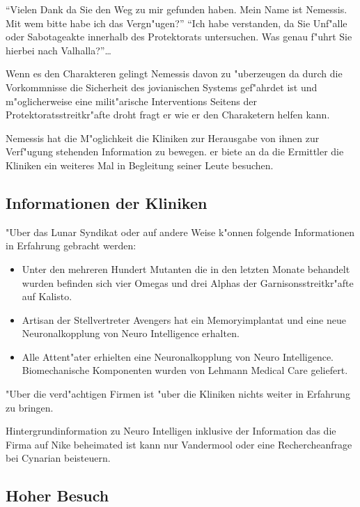 ``Vielen Dank da\3 Sie den Weg zu mir gefunden haben. Mein Name ist Nemessis. Mit wem bitte habe ich das Vergn"ugen?''
``Ich habe verstanden, da\3 Sie Unf"alle oder Sabotageakte innerhalb des Protektorats untersuchen. Was genau f"uhrt Sie hierbei nach Valhalla?''\dots

Wenn es den Charakteren gelingt Nemessis davon zu "uberzeugen da\3 durch die Vorkommnisse die Sicherheit des jovianischen Systems gef"ahrdet ist und m"oglicherweise eine milit"arische Interventions Seitens der Protektoratsstreitkr"afte droht fragt er wie er den Charaketern helfen kann.

\begin{remarks}
Nemessis hat die M"oglichkeit die Kliniken zur Herausgabe von ihnen zur Verf"ugung stehenden Information zu bewegen. er biete an da\3 die Ermittler die Kliniken ein weiteres Mal in Begleitung seiner Leute besuchen.
\end{remarks}

\subsection{Informationen der Kliniken}

"Uber das Lunar Syndikat oder auf andere Weise k"onnen folgende Informationen in Erfahrung gebracht werden:

\begin{itemize}
\item Unter den mehreren Hundert Mutanten die in den letzten Monate behandelt wurden befinden sich vier Omegas und drei Alphas der Garnisonsstreitkr"afte auf Kalisto.
\item Artisan der Stellvertreter Avengers hat ein Memoryimplantat und eine neue Neuronalkopplung von Neuro Intelligence erhalten.
\item Alle Attent"ater erhielten eine Neuronalkopplung von Neuro Intelligence. Biomechanische Komponenten wurden von Lehmann Medical Care geliefert.
\end{itemize}

"Uber die verd"achtigen Firmen ist "uber die Kliniken nichts weiter in Erfahrung zu bringen.

\begin{remarks}
Hintergrundinformation zu Neuro Intelligen inklusive der Information das die Firma auf Nike beheimated ist kann nur Vandermool oder eine Rechercheanfrage bei Cynarian beisteuern.
\end{remarks}

\subsection{Hoher Besuch}

